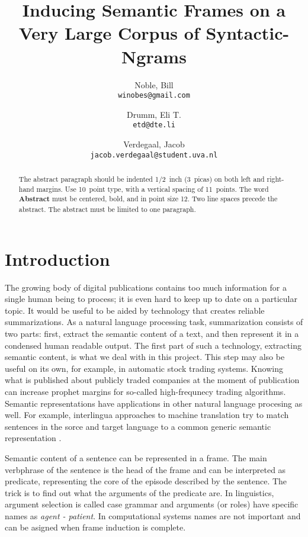\documentclass{article} %
\title{Inducing Semantic Frames on a Very Large Corpus of Syntactic-Ngrams}
\author{
    Noble, Bill\\
    \texttt{winobes@gmail.com}
    \and
    Drumm, Eli T.\\
    \texttt{etd@dte.li}
    \and
    Verdegaal, Jacob\\
    \texttt{jacob.verdegaal@student.uva.nl}
}
\begin{document}
\maketitle


\begin{abstract}
The abstract paragraph should be indented 1/2~inch (3~picas) on both left and
right-hand margins. Use 10~point type, with a vertical spacing of 11~points.
The word \textbf{Abstract} must be centered, bold, and in point size 12. Two
line spaces precede the abstract. The abstract must be limited to one
paragraph.
\end{abstract}

\section{Introduction}
The growing body of digital publications contains too much information for a single human being to process; it is even hard to keep up to date on a particular topic. It would be useful to be aided by technology that creates reliable summarizations. As a natural language processing task, summarization consists of two parts: first, extract the semantic content of a text, and then represent it in a condensed human readable output. The first part of such a technology, extracting semantic content, is what we deal with in this project. This step may also be useful on its own, for example, in automatic stock trading systems. Knowing what is published about publicly traded companies at the moment of publication can increase prophet margins for so-called high-frequnecy trading algorithms. Semantic representations have applications in other natural language procesing as well. For example, interlingua approaches to machine translation try to match sentences in the sorce and target language to a common generic semantic representation \cite{boas2005}.

Semantic content of a sentence can be represented in a frame. The main verbphrase of the sentence is the head of the frame and can be interpreted as predicate, representing the core of the episode described by the sentence. The trick is to find out what the arguments of the predicate are. In linguistics, argument selection is called case grammar \citep{dowty1991} and arguments (or roles) have specific names as \textit{agent - patient}. In computational systems names are not important and can be asigned when frame induction is complete.
\end{document}

